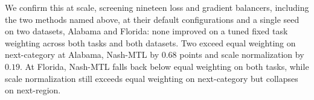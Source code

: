 We confirm this at scale, screening nineteen loss and gradient balancers, including
the two methods named above, at their default configurations and a single seed on two
datasets, Alabama and Florida: none improved on a tuned fixed task weighting across both
tasks and both datasets. Two exceed equal weighting on next-category at Alabama,
Nash-MTL by $0.68$ points and scale normalization by $0.19$. At Florida, Nash-MTL falls
back below equal weighting on both tasks, while scale normalization still exceeds equal
weighting on next-category but collapses on next-region.
